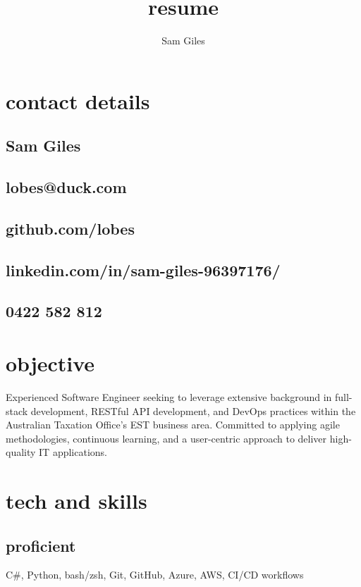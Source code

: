 \documentclass{article}
\begin{document}
\title{resume}
\author{Sam Giles}

\section{contact details }

\subsection{ Sam Giles }

\subsection{ lobes@duck.com }

\subsection{ github.com/lobes }

\subsection{ linkedin.com/in/sam-giles-96397176/ }

\subsection{ 0422 582 812 }

\section{ objective }

Experienced Software Engineer seeking to leverage extensive background in full-stack development, RESTful API development, and DevOps practices within the Australian Taxation Office's EST business area. Committed to applying agile methodologies, continuous learning, and a user-centric approach to deliver high-quality IT applications.

\section{ tech and skills }

\subsection{ proficient }

C\#, Python, bash/zsh, Git, GitHub, Azure, AWS, CI/CD workflows
\end{document}
